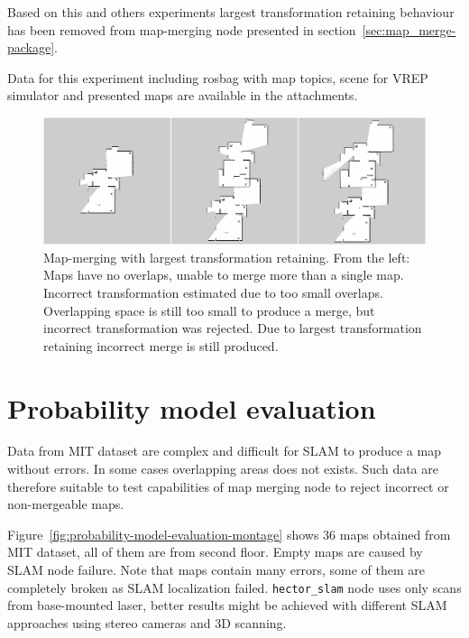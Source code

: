 Based on this and others experiments largest transformation retaining behaviour has been removed from map-merging node presented in section~\ref{sec:map_merge-package}.

Data for this experiment including rosbag with map topics, scene for \gls{VREP} simulator and presented maps are available in the attachments.

\begin{figure}
    \centering
    \includegraphics[width=5.71in]{../img/retaining-largest-transformation-montage.png}
    \caption[Map-merging with largest transformation retaining.]{Map-merging with largest transformation retaining. From the left: Maps have no overlaps, unable to merge more than a single map. Incorrect transformation estimated due to too small overlaps. Overlapping space is still too small to produce a merge, but incorrect transformation was rejected. Due to largest transformation retaining incorrect merge is still produced.}
    \label{fig:retaining-largest-transformation-montage}
\end{figure}

\section{Probability model evaluation}
\label{sec:probability-model-evaluation}

Data from \gls{MIT} dataset are complex and difficult for \gls{SLAM} to produce a map without errors. In some cases overlapping areas does not exists. Such data are therefore suitable to test capabilities of map merging node to reject incorrect or non-mergeable maps.

Figure~\ref{fig:probability-model-evaluation-montage} shows $36$ maps obtained from \gls{MIT} dataset, all of them are from second floor. Empty maps are caused by \gls{SLAM} node failure. Note that maps contain many errors, some of them are completely broken as \gls{SLAM} localization failed. \texttt{hector\_slam} node uses only scans from base-mounted laser, better results might be achieved with different \gls{SLAM} approaches using stereo cameras and 3D scanning.

